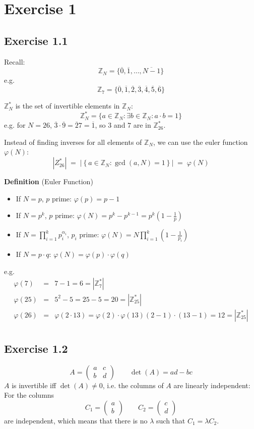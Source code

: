 \documentclass[a4paper]{scrreprt}
\begin{document}
\section*{Exercise 1}
\subsection*{Exercise 1.1}

Recall:
\[\mathbb Z_N = \{\overline 0, \overline 1, \hdots, \overline{N-1}\}\]
e.g.
\[\mathbb Z_7 = \{\overline 0, \overline 1, \overline 2, \overline 3, \overline 4,
\overline 5, \overline 6 \}\]

$\mathbb Z_N^\ast$ is the set of invertible elements in $\mathbb Z_N$:
\[\mathbb Z_N^\ast = \{a\in\mathbb Z_N:\exists b\in\mathbb Z_N: a\cdot b=1\}\]
e.g. for $N = 26$, $\overline 3\cdot \overline 9 = \overline 27=\overline 1$, so $3$ and $7$
are in $\mathbb Z_{26}^*$.

Instead of finding inverses for all elements of $\mathbb Z_N$, we can use the euler function
$\varphi(N)$:
\[\left|Z_{26}^*\right|\;=\;\left|\left\{a\in\mathbb Z_N:
    \gcd(a,N)=1\right\}\right|\;=\;\varphi(N)\]

\textbf{Definition} (Euler Function)\begin{itemize}
    \item If $N=p$, $p$ prime: $\varphi(p) = p-1$
    \item If $N=p^k$, $p$ prime: $\varphi(N) = p^k-p^{k-1}=p^k\left(1-\frac 1 p\right)$
    \item If $N=\prod_{i=1}^k p_i^{\alpha_i}$, $p_i$ prime:
        $\varphi(N)=N\prod_{i=1}^k\left(1-\frac 1 {p_i}\right)$
    \item If $N=p\cdot q$: $\varphi(N)=\varphi(p)\cdot\varphi(q)$
\end{itemize}

e.g.
\begin{eqnarray*}
    \varphi(7) &=& 7-1 = 6 = |\mathbb Z_7^*|\\
    \varphi(25) &=& 5^2-5 = 25- 5 = 20 = |\mathbb Z_{25}^*|\\
    \varphi(26) &=& \varphi(2\cdot 13) = \varphi(2)\cdot\varphi(13) (2- 1)\cdot(13-1) = 12 = |\mathbb Z_{25}^*|\\
\end{eqnarray*}

\subsection*{Exercise 1.2}
\[A=\begin{pmatrix}a&c\\b&d\end{pmatrix}\qquad \det(A)=ad-bc\]
    $A$ is invertible iff $\det(A) \neq 0$, i.e. the columns of $A$ are linearly independent:
For the columns
    \[C_1=\begin{pmatrix}a\\b\end{pmatrix}\qquad C_2=\begin{pmatrix}c\\d\end{pmatrix}\]
are independent, which means that there is no $\lambda$ such that $C_1 =\lambda C_2$.
\end{document}
